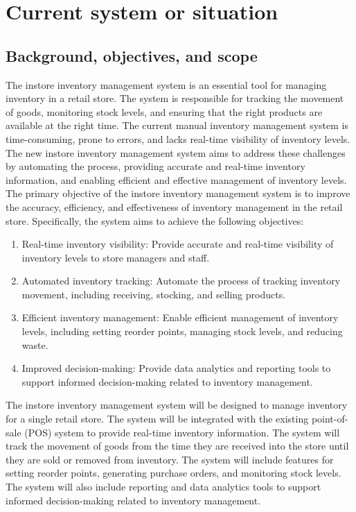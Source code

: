 \chapter{Current system or situation \\ 
\label{Chapter::Currentsystemorsituation}} 
\section{Background, objectives, and scope \label{Section::Backgroundobjectivesandscope}}
The instore inventory management system is an essential tool for managing inventory in a retail store. The system is responsible for tracking the movement of goods, monitoring stock levels, and ensuring that the right products are available at the right time. The current manual inventory management system is time-consuming, prone to errors, and lacks real-time visibility of inventory levels. The new instore inventory management system aims to address these challenges by automating the process, providing accurate and real-time inventory information, and enabling efficient and effective management of inventory levels.
The primary objective of the instore inventory management system is to improve the accuracy, efficiency, and effectiveness of inventory management in the retail store. Specifically, the system aims to achieve the following objectives:
\begin{enumerate}    
\item Real-time inventory visibility: Provide accurate and real-time visibility of inventory levels to store managers and staff.

\item Automated inventory tracking: Automate the process of tracking inventory movement, including receiving, stocking, and selling products.

\item Efficient inventory management: Enable efficient management of inventory levels, including setting reorder points, managing stock levels, and reducing waste.

\item Improved decision-making: Provide data analytics and reporting tools to support informed decision-making related to inventory management.
\end{enumerate}
The instore inventory management system will be designed to manage inventory for a single retail store. The system will be integrated with the existing point-of-sale (POS) system to provide real-time inventory information. The system will track the movement of goods from the time they are received into the store until they are sold or removed from inventory. The system will include features for setting reorder points, generating purchase orders, and monitoring stock levels. The system will also include reporting and data analytics tools to support informed decision-making related to inventory management.

